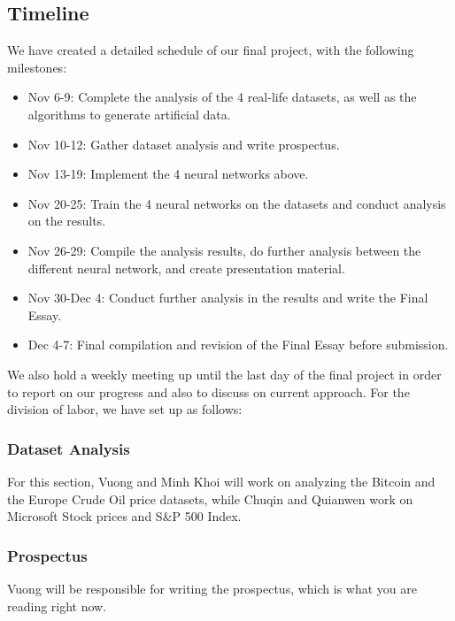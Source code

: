 \documentclass[letterpaper, 10 pt, conference]{ieeeconf}  %
\begin{document}
    \subsection{Timeline}
    We have created a detailed schedule of our final project, with the following milestones:
    \begin{itemize}
        \item Nov 6-9: Complete the analysis of the 4 real-life datasets, as well as the algorithms to generate artificial data.
        \item Nov 10-12: Gather dataset analysis and write prospectus.
        \item Nov 13-19: Implement the 4 neural networks above.
        \item Nov 20-25: Train the 4 neural networks on the datasets and conduct analysis on the results.
        \item Nov 26-29: Compile the analysis results, do further analysis between the different neural network, and create presentation material.
        \item Nov 30-Dec 4: Conduct further analysis in the results and write the Final Essay.
        \item Dec 4-7: Final compilation and revision of the Final Essay before submission. 
    \end{itemize}

    We also hold a weekly meeting up until the last day of the final project in order to report on our progress and also to discuss on current approach. For the division of labor, we have set up as follows:

    \subsubsection{Dataset Analysis} For this section, Vuong and Minh Khoi will work on analyzing the Bitcoin and the Europe Crude Oil price datasets, while Chuqin and Quianwen work on Microsoft Stock prices and S\&P 500 Index.

    \subsubsection{Prospectus} Vuong will be responsible for writing the prospectus, which is what you are reading right now.
\end{document}
